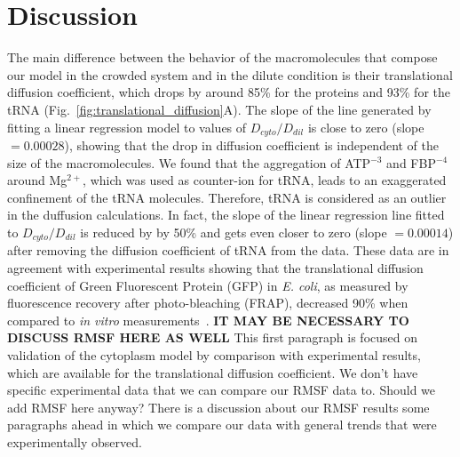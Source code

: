 \documentclass[journal=jcisd8,manuscript=article]{achemso}
\begin{document}
\section*{Discussion}\label{sec:dissc}
The main difference between the behavior of the macromolecules that
compose our model in the crowded system and in the dilute condition is
their translational diffusion coefficient, which drops by around
85\% for the proteins and 93\% for the tRNA
(Fig.~\ref{fig:translational_diffusion}A). The slope of the line
generated by fitting a linear regression model to values of
$D_{cyto}/D_{dil}$ is close to zero (slope $= 0.00028$), showing that
the drop in diffusion coefficient is independent of the size of the
macromolecules. We found that the aggregation of ATP$^{-3}$ and
FBP$^{-4}$ around Mg$^{2+}$, which was used as counter-ion for tRNA,
leads to an exaggerated confinement of the tRNA molecules.  Therefore,
tRNA is considered as an outlier in the duffusion calculations. In
fact, the slope of the linear regression line fitted to
$D_{cyto}/D_{dil}$ is reduced by by 50\% and gets even closer to zero
(slope $= 0.00014$) after removing the diffusion coefficient of tRNA
from the data. These data are in agreement with experimental results
showing that the translational diffusion coefficient of Green
Fluorescent Protein (GFP) in {\em E. coli}, as measured by
fluorescence recovery after photo-bleaching (FRAP), decreased 90\%
when compared to {\em in vitro}
measurements~\cite{Elowitz1999,Konopka2006}.
{\bf IT MAY BE NECESSARY TO DISCUSS RMSF HERE AS WELL} {\color{blue} This first paragraph is focused on validation of the cytoplasm model by comparison with experimental results, which are available for the translational diffusion coefficient. We don't have specific experimental data that we can compare our RMSF data to. Should we add RMSF here anyway? There is a discussion about our RMSF results some paragraphs ahead in which we compare our data with general trends that were experimentally observed.}
\end{document}
